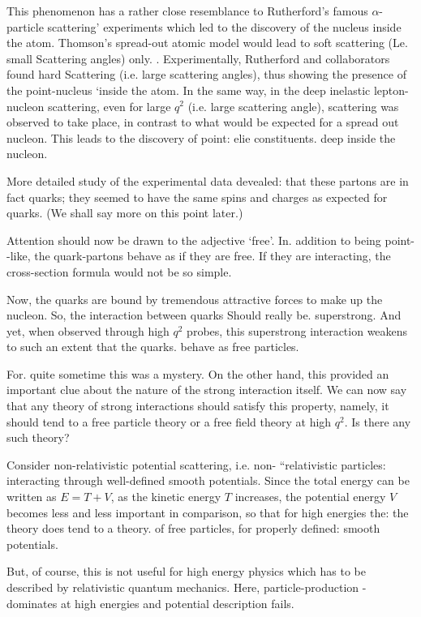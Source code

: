 This phenomenon has a rather close resemblance to Rutherford's famous $\alpha$-particle scattering’ experiments which led to the discovery of the nucleus inside the atom. Thomson’s spread-out atomic model would lead to soft scattering (Le. small Scattering angles) only. . Experimentally, Rutherford and collaborators found hard Scattering (i.e. large scattering angles), thus showing the presence of the point-nucleus ‘inside the atom. In the same way, in the deep inelastic lepton-nucleon scattering, even for large $q^{2}$ (i.e. large scattering angle), scattering was observed to take place, in contrast to what would be expected for a spread
out nucleon. This leads to the discovery of point: elie constituents. deep
inside the nucleon. 

More detailed study of the experimental data devealed: that these
partons are in fact quarks; they seemed to have the same spins and charges
as expected for quarks. (We shall say more on this point later.) 

Attention should now be drawn to the adjective ‘free’. In. addition to
being point- -like, the quark-partons behave as if they are free. If they are
interacting, the cross-section formula would not be so simple. 

Now, the quarks are bound by tremendous attractive forces to make
up the nucleon. So, the interaction between quarks Should really be.
superstrong. And yet, when observed through high $q^{2}$ probes, this superstrong interaction weakens to such an extent that the quarks. behave as
free particles. 

For. quite sometime this was a mystery. On the other hand, this
provided an important clue about the nature of the strong interaction
itself. We can now say that any theory of strong interactions should
satisfy this property, namely, it should tend to a free particle theory or a
free field theory at high $q^{2}$. Is there any such theory? 

Consider non-relativistic potential scattering, i.e. non- “relativistic particles: interacting through well-defined smooth potentials. Since the total
energy can be written as $E= T+ V$, as the kinetic energy $T$ increases, the
potential energy $V$ becomes less and less important in comparison, so that
for high energies the: the theory does tend to a theory. of free particles, for
properly defined: smooth potentials. 


But, of course, this is not useful for high energy physics which has to
be described by relativistic quantum mechanics. Here, particle-production -
dominates at high energies and potential description fails. 

